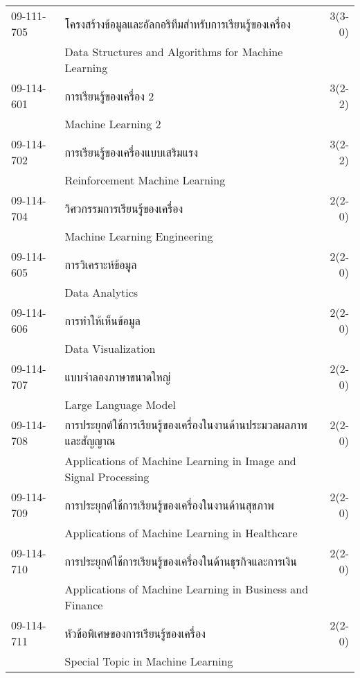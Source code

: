 \begin{longtable}{p{}p{}r{}}
09-111-705 & โครงสร้างข้อมูลและอัลกอริทึมสำหรับการเรียนรู้ของเครื่อง & 3(3-0)\\
& Data Structures and Algorithms for Machine Learning & \\[3mm]
09-114-601 & การเรียนรู้ของเครื่อง 2 & 3(2-2)\\
& Machine Learning 2 & \\[3mm]
09-114-702 & การเรียนรู้ของเครื่องแบบเสริมแรง & 3(2-2)\\
& Reinforcement Machine Learning & \\[3mm]
09-114-704 & วิศวกรรมการเรียนรู้ของเครื่อง & 2(2-0)\\
& Machine Learning Engineering & \\[3mm]
09-114-605 & การวิเคราะห์ข้อมูล & 2(2-0)\\
& Data Analytics & \\[3mm]
09-114-606 & การทำให้เห็นข้อมูล & 2(2-0)\\
& Data Visualization & \\[3mm]
09-114-707 & แบบจำลองภาษาขนาดใหญ่ & 2(2-0)\\
& Large Language Model & \\[3mm]
09-114-708 & การประยุกต์ใช้การเรียนรู้ของเครื่องในงานด้านประมวลผลภาพและสัญญาณ & 2(2-0)\\
& Applications of Machine Learning in Image and Signal Processing & \\[3mm]
09-114-709 & การประยุกต์ใช้การเรียนรู้ของเครื่องในงานด้านสุขภาพ  & 2(2-0)\\
& Applications of Machine Learning in Healthcare & \\[3mm]
09-114-710 & การประยุกต์ใช้การเรียนรู้ของเครื่องในด้านธุรกิจและการเงิน & 2(2-0)\\
& Applications of Machine Learning in Business and Finance & \\[3mm]
09-114-711 & หัวข้อพิเศษของการเรียนรู้ของเครื่อง  & 2(2-0)\\
& Special Topic in Machine Learning & \\[3mm]
\end{longtable}
